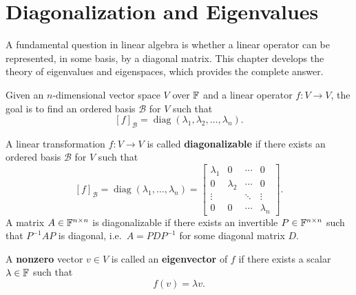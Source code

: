 \section{Diagonalization and Eigenvalues}
\label{sec:diagonalization}

A fundamental question in linear algebra is whether a linear operator can be
represented, in some basis, by a diagonal matrix.  This chapter develops the
theory of eigenvalues and eigenspaces, which provides the complete answer.

\begin{tipbox}
\label{rem:aim-diag}
Given an $n$-dimensional vector space $V$ over $\mathbb{F}$ and a linear operator
$f:V\to V$, the goal is to find an ordered basis $\mathcal{B}$ for $V$ such
that
\[
    [f]_{\mathcal{B}} = \operatorname{diag}(\lambda_1,\lambda_2,\ldots,\lambda_n).
\]
\end{tipbox}

\begin{defbox}
\label{def:diagonalizable}
A linear transformation $f:V\to V$ is called \textbf{diagonalizable} if
there exists an ordered basis $\mathcal{B}$ for $V$ such that
\[
    [f]_{\mathcal{B}} = \operatorname{diag}(\lambda_1,\ldots,\lambda_n)
    = \begin{bmatrix}
        \lambda_1 & 0 & \cdots & 0 \\
        0 & \lambda_2 & \cdots & 0 \\
        \vdots & & \ddots & \vdots \\
        0 & 0 & \cdots & \lambda_n
      \end{bmatrix}.
\]
A matrix $A\in\mathbb{F}^{n\times n}$ is diagonalizable if there exists an
invertible $P\in\mathbb{F}^{n\times n}$ such that $P^{-1}AP$ is diagonal, i.e.\
$A=PDP^{-1}$ for some diagonal matrix $D$.
\end{defbox}

\begin{defbox}
\label{def:eigenvector}
A \textbf{nonzero} vector $v\in V$ is called an \textbf{eigenvector} of $f$
if there exists a scalar $\lambda\in\mathbb{F}$ such that
\[
    f(v) = \lambda v.
\]
\end{defbox}


